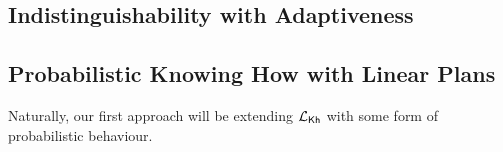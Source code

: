 \subsection{Indistinguishability with Adaptiveness}










\subsection{Probabilistic Knowing How with Linear Plans}
Naturally, our first approach will be extending $\mathcal{L}_{{\mathsf{Kh}}}$ with some form of probabilistic behaviour. 





